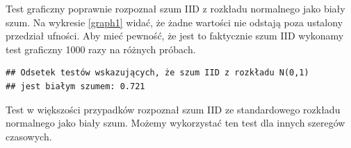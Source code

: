 \documentclass[10pt, a4paper]{article}\usepackage[]{graphicx}\usepackage[]{xcolor}
\makeatletter
\newenvironment{kframe}{%
 \def\at@end@of@kframe{}%
 \ifinner\ifhmode%
  \def\at@end@of@kframe{\end{minipage}}%
  \begin{minipage}{\columnwidth}%
 \fi\fi%
 \def\FrameCommand##1{\hskip\@totalleftmargin \hskip-\fboxsep
 \colorbox{shadecolor}{##1}\hskip-\fboxsep
     \hskip-\linewidth \hskip-\@totalleftmargin \hskip\columnwidth}%
 \MakeFramed {\advance\hsize-\width
   \@totalleftmargin\z@ \linewidth\hsize
   \@setminipage}}%
 {\par\unskip\endMakeFramed%
 \at@end@of@kframe}
\newenvironment{knitrout}{}{} %
\makeatother
\begin{document}
Test graficzny poprawnie rozpoznał szum IID z rozkładu normalnego jako biały szum. Na wykresie \ref{graph1} widać, że żadne wartości nie odstają poza ustalony przedział ufności. Aby mieć pewność, że jest to faktycznie szum IID wykonamy test graficzny 1000 razy na różnych próbach.
\begin{knitrout}
\color{fgcolor}\begin{kframe}
\begin{verbatim}
## Odsetek testów wskazujących, że szum IID z rozkładu N(0,1)
## jest białym szumem: 0.721
\end{verbatim}
\end{kframe}
\end{knitrout}
Test w większości przypadków rozpoznał szum IID ze standardowego rozkładu normalnego jako biały szum. Możemy wykorzystać ten test dla innych szeregów czasowych.
\end{document}
